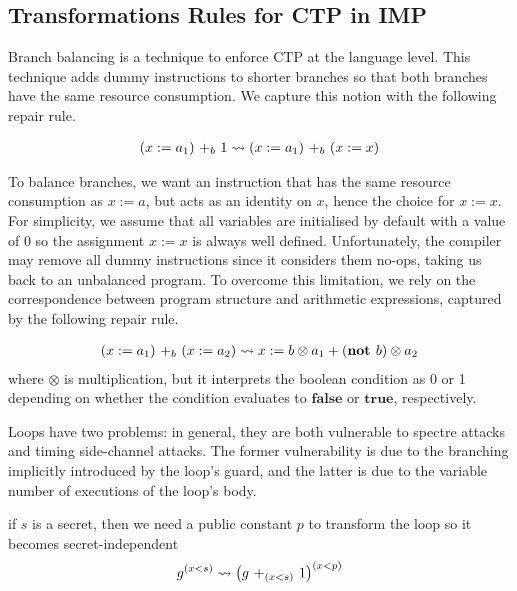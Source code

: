 \subsection{Transformations Rules for CTP in IMP}
Branch balancing is a technique to enforce CTP at the language level. This technique adds dummy instructions to shorter branches so that both branches have the same resource consumption. We capture this notion with the following repair rule.
\begin{definition}
\begin{align*}
\branch{b}{(x:=a_1)}{1} \leadsto \branch{b}{(x:=a_1)}{(x:=x)}
\end{align*}
\end{definition}
To balance branches, we want an instruction that has the same resource consumption as $x:=a$, but acts as an identity on $x$, hence the choice for $x:=x$. For simplicity, we assume that all variables are initialised by default with a value of 0 so the assignment $x:=x$ is always well defined. 
Unfortunately, the compiler may remove all dummy instructions since it considers them no-ops, taking us back to an unbalanced program. To overcome this limitation, we rely on the correspondence between program structure and arithmetic expressions, captured by the following repair rule.
\begin{definition}
\begin{align*}
\branch{b}{(x:=a_1)}{(x:=a_2)} \leadsto x:=b\otimes a_1+(\textbf{not }b)\otimes a_2
\end{align*}
where $\otimes$ is multiplication, but it interprets the boolean condition as 0 or 1 depending on whether the condition evaluates to $\textbf{false}$ or $\textbf{true}$, respectively. 
\end{definition}
Loops have two problems: in general, they are both vulnerable to spectre attacks and timing side-channel attacks. The former vulnerability is due to the branching implicitly introduced by the loop's guard, and the latter is due to the variable number of executions of the loop's body.
\begin{definition}
if $s$ is a secret, then we need a public constant $p$  to transform the loop so it becomes secret-independent
\begin{align*}
\iterate{x<s}{g} \leadsto \iterate{x<p}{\left(\branch{(x<s)}{g}{1}\right)}
\end{align*}
\end{definition}
